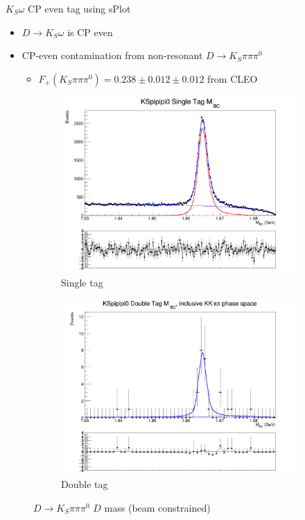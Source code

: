 \documentclass{beamer}
\begin{document}
\begin{frame}{$K_S\omega$ CP even tag using sPlot}
  \begin{itemize}
    \setlength\itemsep{0.5em}
    \item{$D\to K_S\omega$ is CP even}
    \item{CP-even contamination from non-resonant $D\to K_S\pi\pi\pi^0$}
    \begin{itemize}
      \item{$F_+(K_S\pi\pi\pi^0) = 0.238\pm0.012\pm0.012$ from CLEO}
    \end{itemize}
  \end{itemize}
  \begin{figure}
    \centering
    \vspace{-0.2cm}
    \begin{subfigure}{0.40\textwidth}
      \includegraphics[width = 1.0\textwidth]{Plots/KSpipipi0_SingleTag_MBC_Plot.png}
      \caption{Single tag}
    \end{subfigure}%
    \begin{subfigure}{0.40\textwidth}
      \includegraphics[width = 1.0\textwidth]{Plots/DoubleTagYield_DoubleTag_CP_KKpipi_vs_KSpipipi0_SignalBin0.png}
      \caption{Double tag}
    \end{subfigure}
    \caption{$D\to K_S\pi\pi\pi^0$ $D$ mass (beam constrained)}
  \end{figure}
\end{frame}
\end{document}

